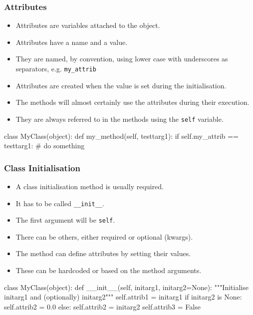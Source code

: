 \documentclass{beamer}
\begin{document}
\begin{frame}[fragile]
\frametitle{Attributes}

\begin{itemize}
\item Attributes are variables attached to the object.
\item Attributes have a name and a value.
\item They are named, by convention, using lower case with underscores as separators, 
e.g. \lstinline|my_attrib|
\pause
\item Attributes are created when the value is set during the initialisation.
\pause
\item The methods will almost certainly use the attributes during their execution.
\pause
\item They are always referred to in the methods using the \lstinline|self| variable.
\end{itemize}
\begin{code}
class MyClass(object):
  def my_method(self, testtarg1):
    if self.my_attrib == testtarg1:
      # do something
\end{code}
\end{frame}

\begin{frame}[fragile]
\frametitle{Class Initialisation}
\begin{itemize}
\item A class initialisation method is usually required.
\item It has to be called \lstinline|__init__|.
\item The first argument will be \lstinline|self|.
\pause
\item There can be others, either required or optional (kwargs).
\item The method can define attributes by setting their values.
\pause
\item These can be hardcoded or based on the method arguments.
\end{itemize}

\begin{code}
class MyClass(object):
  def __init__(self, initarg1, initarg2=None):
    """Initialise initarg1 and (optionally) initarg2"""
    self.attrib1 = initarg1
    if initarg2 is None:
      self.attrib2 = 0.0
    else:
      self.attrib2 = initarg2
    self.attrib3 = False
\end{code}

\end{frame}
\end{document}
